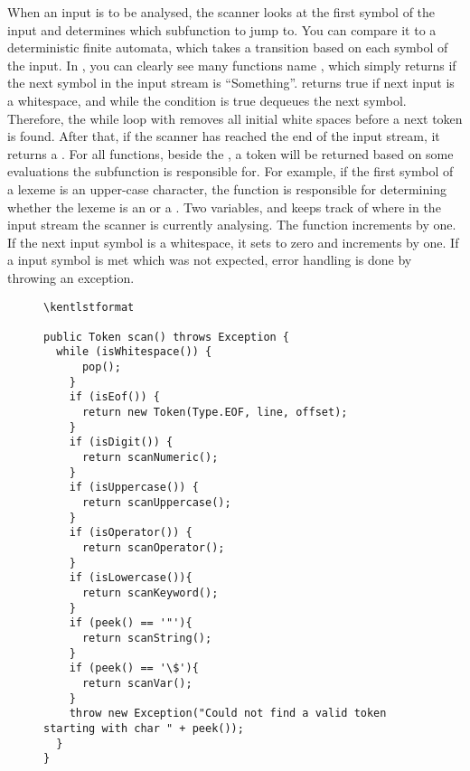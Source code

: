 When an input is to be analysed, the scanner looks at the first symbol of the input and determines which subfunction to jump to. You can compare it to a deterministic finite automata, which takes a transition based on each symbol of the input. In , you can clearly see many functions name , which simply returns if the next symbol in the input stream is ``Something''.  returns true if next input is a whitespace, and while the condition is true  dequeues the next symbol. Therefore, the while loop with  removes all initial white spaces before a next token is found. After that, if the scanner has reached the end of the input stream, it returns a . For all  functions, beside the , a token will be returned based on some evaluations the subfunction is responsible for. For example, if the first symbol of a lexeme is an upper-case character, the function  is responsible for determining whether the lexeme is an  or a . Two variables,   and   keeps track of where in the input stream the scanner is currently analysing. The function  increments  by one. If the next input symbol is a whitespace, it sets  to zero and increments  by one. If a input symbol is met which was not expected, error handling is done by throwing an exception. 

\begin{figure}
\begin{lstlisting}\kentlstformat

public Token scan() throws Exception {
  while (isWhitespace()) {
      pop();
    }
    if (isEof()) {
      return new Token(Type.EOF, line, offset);
    }
    if (isDigit()) {
      return scanNumeric();
    }
    if (isUppercase()) {
      return scanUppercase();
    }
    if (isOperator()) {
      return scanOperator();
    }
    if (isLowercase()){
      return scanKeyword();
    }
    if (peek() == '"'){
      return scanString();
    }
    if (peek() == '\$'){
      return scanVar();
    }
    throw new Exception("Could not find a valid token starting with char " + peek());
  }
}
\end{lstlisting}
\label{lst:scan}
\end{figure}